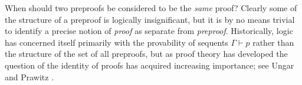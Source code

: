 \documentclass[english,letter paper,12pt,leqno]{article}
\theoremstyle{example}
\numberwithin{equation}{section}
\def\imp{\supset}
\begin{document}

When should two preproofs be considered to be the \emph{same} proof? Clearly some of the structure of a preproof is logically insignificant, but it is by no means trivial to identify a precise notion of \emph{proof} as separate from \emph{preproof}. Historically, logic has concerned itself primarily with the provability of sequents $\Gamma \vdash p$ rather than the structure of the set of all preproofs, but as proof theory has developed the question of the identity of proofs has acquired increasing importance; see Ungar \cite{ungar} and Prawitz \cite[\S 4.3]{prawitz_phil}.
\end{document}
